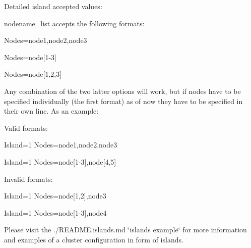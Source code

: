 Detailed island accepted values\+:
\begin{DoxyItemize}
\item nodename\+\_\+list accepts the following formats\+:
\begin{DoxyItemize}
\item Nodes={\ttfamily node1,node2,node3}
\item Nodes={\ttfamily node\mbox{[}1-\/3\mbox{]}}
\item Nodes={\ttfamily node\mbox{[}1,2,3\mbox{]}}
\end{DoxyItemize}
\item Any combination of the two latter options will work, but if nodes have to be specified individually (the first format) as of now they have to be specified in their own line. As an example\+:
\begin{DoxyItemize}
\item Valid formats\+:
\begin{DoxyItemize}
\item Island=1 Nodes={\ttfamily node1,node2,node3}
\item Island=1 Nodes={\ttfamily node\mbox{[}1-\/3\mbox{]},node\mbox{[}4,5\mbox{]}}
\end{DoxyItemize}
\item Invalid formats\+:
\begin{DoxyItemize}
\item Island=1 Nodes={\ttfamily node\mbox{[}1,2\mbox{]},node3}
\item Island=1 Nodes={\ttfamily node\mbox{[}1-\/3\mbox{]},node4}
\end{DoxyItemize}
\end{DoxyItemize}
\end{DoxyItemize}

Please visit the ./\+R\+E\+A\+D\+ME.islands.\+md \char`\"{}islands example\char`\"{} for more information and examples of a cluster configuration in form of islands. 